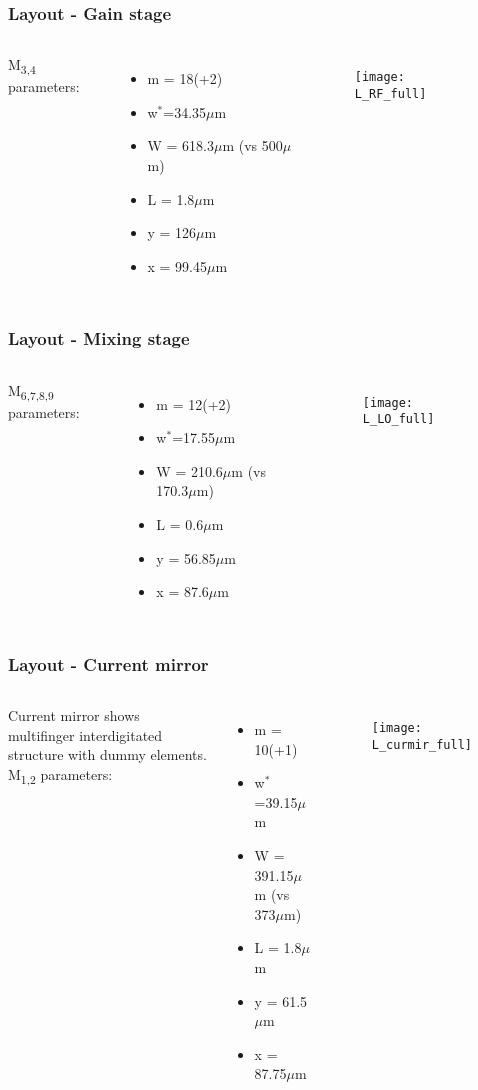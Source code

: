 \begin{frame}
	\frametitle{Layout - Gain stage}
	\begin{columns}
		M\textsubscript{3,4} parameters:
			\begin{itemize}
				\item m = 18(+2)
				\item w$^*$=34.35$\mu$m
				\item W = 618.3$\mu$m (vs 500$\mu$m)
				\item L = 1.8$\mu$m
				\item y = 126$\mu$m
				\item x = 99.45$\mu$m
			\end{itemize}
		\begin{figure}[H]
			\centering
			\texttt{[image: L\_RF\_full]}
			\label{L_RF_full}
		\end{figure}
	\end{columns}
\end{frame}


\begin{frame}
\frametitle{Layout - Mixing stage}
	\begin{columns}
	\column{0.3\textwidth}
	M\textsubscript{6,7,8,9} parameters:
	\begin{itemize}
		\item m = 12(+2)
		\item w$^*$=17.55$\mu$m
		\item W = 210.6$\mu$m (vs 170.3$\mu$m)
		\item L = 0.6$\mu$m
		\item y = 56.85$\mu$m
		\item x = 87.6$\mu$m
	\end{itemize}
	\column{0.7\textwidth}
	\begin{figure}[H]
		\centering
		\texttt{[image: L\_LO\_full]}
		\label{L_LO_full}
	\end{figure}
	\end{columns}
\end{frame}

\begin{frame}
	\frametitle{Layout - Current mirror}
	\begin{columns}
		\column{0.4\textwidth}
		Current mirror shows multifinger interdigitated structure with dummy elements. M\textsubscript{1,2} parameters:
		\begin{itemize}
			\item m = 10(+1)
			\item w$^*$=39.15$\mu$m
			\item W = 391.15$\mu$m (vs 373$\mu$m)
			\item L = 1.8$\mu$m
			\item y = 61.5$\mu$m
			\item x = 87.75$\mu$m
		\end{itemize}
		\column{0.6\textwidth}
		\begin{figure}[H]
			\centering
			\texttt{[image: L\_curmir\_full]}
			\label{L_curmir_full}
		\end{figure}
	\end{columns}
\end{frame}


